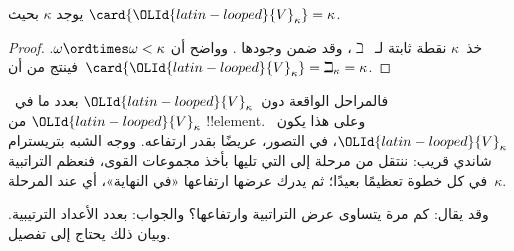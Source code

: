 \documentclass[../../../include/open-logic-section]{subfiles}
\begin{document}
\begin{cor}
يوجد $\kappa$ بحيث $\card{{\OLId{latin-looped}{V}}_\kappa} = \kappa$.
\end{cor}

\begin{proof}
خذ~$\kappa$ نقطة ثابتة لـ~$\beth$، وقد ضمن وجودها
. وواضح أن
$\omega \ordtimes \omega < \kappa$. فينتج من
 أن~$\card{{\OLId{latin-looped}{V}}_\kappa} = \beth_\kappa= \kappa$.
\end{proof}

فالمراحل الواقعة دون~${\OLId{latin-looped}{V}}_\kappa$ بعدد ما في~${\OLId{latin-looped}{V}}_\kappa$ من
!!{element}. وعلى هذا يكون~${\OLId{latin-looped}{V}}_\kappa$، في التصور، عريضًا بقدر ارتفاعه.
ووجه الشبه بتريسترام شاندي قريب: ننتقل من مرحلة إلى التي تليها بأخذ
مجموعات القوى، فنعظم التراتبية في كل خطوة تعظيمًا بعيدًا؛ ثم يدرك عرضها
ارتفاعها «في النهاية»، أي عند المرحلة~$\kappa$.

وقد يقال: كم مرة يتساوى عرض التراتبية وارتفاعها؟ والجواب: بعدد الأعداد
الترتيبية. وبيان ذلك يحتاج إلى تفصيل.
\end{document}
